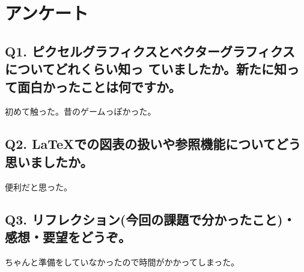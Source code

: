 \documentclass[11pt,a4j]{jarticle}
\begin{document}
\section{アンケート}

\subsection*{Q1. ピクセルグラフィクスとベクターグラフィクスについてどれくらい知っ ていましたか。新たに知って面白かったことは何ですか。}
初めて触った。昔のゲームっぽかった。
\subsection*{Q2. LaTeXでの図表の扱いや参照機能についてどう思いましたか。}
便利だと思った。
\subsection*{Q3. リフレクション(今回の課題で分かったこと)・感想・要望をどうぞ。}
ちゃんと準備をしていなかったので時間がかかってしまった。
\end{document}
